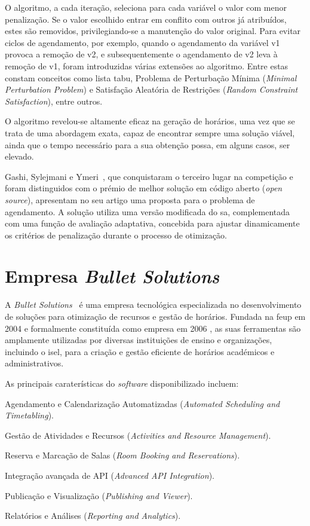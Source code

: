 O algoritmo, a cada iteração, seleciona para cada variável o valor com menor penalização. Se o valor escolhido entrar em conflito com outros já atribuídos, estes são removidos, privilegiando-se a manutenção do valor original. Para evitar ciclos de agendamento, por exemplo, quando o agendamento da variável v1 provoca a remoção de v2, e subsequentemente o agendamento de v2 leva à remoção de v1, foram introduzidas várias extensões ao algoritmo. Entre estas constam conceitos como lista tabu, Problema de Perturbação Mínima (\textit{Minimal Perturbation Problem}) e Satisfação Aleatória de Restrições (\textit{Random Constraint Satisfaction}), entre outros.

O algoritmo revelou-se altamente eficaz na geração de horários, uma vez que se trata de uma abordagem exata, capaz de encontrar sempre uma solução viável, ainda que o tempo necessário para a sua obtenção possa, em alguns casos, ser elevado.

Gashi, Sylejmani e Ymeri~\cite{Simulatedannealingpenalization-Sylejmani-2022}, que conquistaram o terceiro lugar na competição e foram distinguidos com o prémio de melhor solução em código aberto (\textit{open source}), apresentam no seu artigo uma proposta para o problema de agendamento. A solução utiliza uma versão modificada do \gls{sa}, complementada com uma função de avaliação adaptativa, concebida para ajustar dinamicamente os critérios de penalização durante o processo de otimização.

\section{Empresa \textit{Bullet Solutions}}
\label{capitulo2:Bullet-Solutions}

A \textit{Bullet Solutions}~\cite{bulletsolutions-Website} é uma empresa tecnológica especializada no desenvolvimento de soluções para otimização de recursos e gestão de horários. Fundada na \gls{feup} em 2004 e formalmente constituída como empresa em 2006 \cite{bulletsolutions-foundation-information}, as suas ferramentas são amplamente utilizadas por diversas instituições de ensino e organizações, incluindo o \gls{isel}, para a criação e gestão eficiente de horários académicos e administrativos.

As principais caraterísticas do \textit{software} disponibilizado incluem:

\begin{compactitem}
    \item Agendamento e Calendarização Automatizadas (\textit{Automated Scheduling and Timetabling}).
    \item Gestão de Atividades e Recursos (\textit{Activities and Resource Management}).
    \item Reserva e Marcação de Salas (\textit{Room Booking and Reservations}).
    \item Integração avançada de API (\textit{Advanced API Integration}).
    \item Publicação e Visualização (\textit{Publishing and Viewer}).
    \item Relatórios e Análises (\textit{Reporting and Analytics}).
\end{compactitem}

